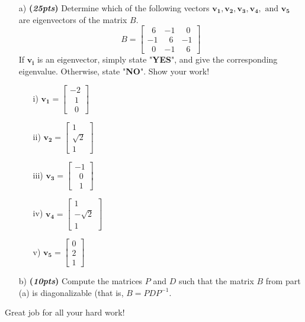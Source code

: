 \documentclass[12pt]{article}%
\begin{document}
\begin{enumerate}
\begin{itemize}
    \item[a)] \textbf{(\emph{25pts})} Determine which of the following vectors \(\mathbf{v_1}, \mathbf{v_2}, \mathbf{v_3}, \mathbf{v_4},\text{ and } \mathbf{v_5}\) are eigenvectors of the matrix \(B\).
        \[B = \begin{bmatrix} \;\;6 & -1 & \;\;0 \\ -1 & \;\;6 & -1 \\\;\; 0 & -1 & \;\;6 \end{bmatrix}\]
    If \(\mathbf{v_i}\) is an eigenvector, simply state "\textbf{YES}", and give the corresponding eigenvalue.
    Otherwise, state "\textbf{NO}". Show your work!
    \begin{itemize}
        \item[i)] \(\mathbf{v_1}=\begin{bmatrix}-2\\ \;\;1\\\;\;0\end{bmatrix}\)
        \vspace{3cm}
        \item [ii)] \(\mathbf{v_2}=\begin{bmatrix}1\\ \sqrt{2}\\1\end{bmatrix}\)
        \vspace{3cm}
        \item[iii)]  \(\mathbf{v_3}=\begin{bmatrix}-1\\ \;\;0\\ \;\;1\end{bmatrix}\)
        \vspace{3cm}
        \item [iv)] \(\mathbf{v_4}=\begin{bmatrix}1\\ -\sqrt{2}\\1\end{bmatrix}\)
        \vspace{3cm}
        \item [v)] \(\mathbf{v_5}=\begin{bmatrix}0\\ 2\\1\end{bmatrix}\)
    \end{itemize}

    
    
    \vspace{5cm}
    
    \item[b)] \textbf{(\emph{10pts})} Compute the matrices \(P\) and \(D\) such that the matrix \(B\) from part (a) is diagonalizable (that is, \(B=PDP^{-1}\).
    \end{itemize}
\end{enumerate}

\vspace{20cm}

\begin{center}
    Great job for all your hard work!
\end{center}
\end{document}
